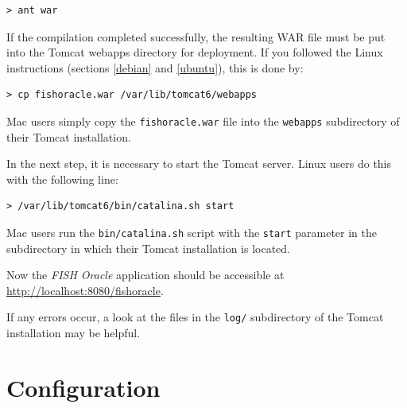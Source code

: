\documentclass[11pt,final]{article}
\newcommand{\Gt}[0]{\emph{GenomeTools}\xspace}
\newcommand{\Gtj}[0]{\emph{GenomeTools-Java}\xspace}
\newcommand{\FO}[0]{\emph{FISH Oracle}\xspace}
\begin{document}
\begin{lstlisting}
> ant war
\end{lstlisting}

If the compilation completed successfully, the resulting WAR file must be
put into the Tomcat webapps directory for deployment.
If you followed the Linux instructions (sections \ref{debian} and \ref{ubuntu}),
this is done by:

\begin{lstlisting}
> cp fishoracle.war /var/lib/tomcat6/webapps
\end{lstlisting}

Mac users simply copy the \texttt{fishoracle.war} file into the \texttt{webapps}
subdirectory of their Tomcat installation.

In the next step, it is necessary to start the Tomcat server. Linux users do
this with the following line:

\begin{lstlisting}
> /var/lib/tomcat6/bin/catalina.sh start
\end{lstlisting}

Mac users run the \texttt{bin/catalina.sh} script with the \texttt{start}
parameter in the subdirectory in which their Tomcat installation is located.

Now the \FO application should be accessible at
\url{http://localhost:8080/fishoracle}.

If any errors occur, a look at the files in the \texttt{log/} subdirectory of
the Tomcat installation may be helpful.





\section{Configuration}
\end{document}
